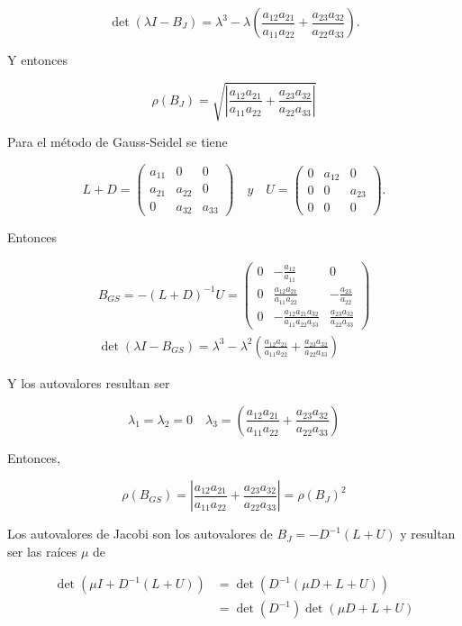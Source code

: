\documentclass[10pt]{book}
\begin{document}
$$
\operatorname{det}\left(\lambda I-B_{J}\right)=\lambda^{3}-\lambda\left(\frac{a_{12} a_{21}}{a_{11} a_{22}}+\frac{a_{23} a_{32}}{a_{22} a_{33}}\right) .
$$

Y entonces

$$
\rho\left(B_{J}\right)=\sqrt{\left|\frac{a_{12} a_{21}}{a_{11} a_{22}}+\frac{a_{23} a_{32}}{a_{22} a_{33}}\right|}
$$

Para el método de Gauss-Seidel se tiene

$$
L+D=\left(\begin{array}{ccc}
a_{11} & 0 & 0 \\
a_{21} & a_{22} & 0 \\
0 & a_{32} & a_{33}
\end{array}\right) \quad y \quad U=\left(\begin{array}{ccc}
0 & a_{12} & 0 \\
0 & 0 & a_{23} \\
0 & 0 & 0
\end{array}\right) .
$$

Entonces

$$
\begin{gathered}
B_{G S}=-(L+D)^{-1} U=\left(\begin{array}{ccc}
0 & -\frac{a_{12}}{a_{11}} & 0 \\
0 & \frac{a_{12} a_{21}}{a_{11} a_{22}} & -\frac{a_{23}}{a_{22}} \\
0 & -\frac{a_{12} a_{21} a_{32}}{a_{11} a_{22} a_{33}} & \frac{a_{23} a_{32}}{a_{22} a_{33}}
\end{array}\right) \\
\operatorname{det}\left(\lambda I-B_{G S}\right)=\lambda^{3}-\lambda^{2}\left(\frac{a_{12} a_{21}}{a_{11} a_{22}}+\frac{a_{23} a_{32}}{a_{22} a_{33}}\right)
\end{gathered}
$$

Y los autovalores resultan ser

$$
\lambda_{1}=\lambda_{2}=0 \quad \lambda_{3}=\left(\frac{a_{12} a_{21}}{a_{11} a_{22}}+\frac{a_{23} a_{32}}{a_{22} a_{33}}\right)
$$

Entonces,

$$
\rho\left(B_{G S}\right)=\left|\frac{a_{12} a_{21}}{a_{11} a_{22}}+\frac{a_{23} a_{32}}{a_{22} a_{33}}\right|=\rho\left(B_{J}\right)^{2}
$$

Los autovalores de Jacobi son los autovalores de $B_{J}=-D^{-1}(L+U)$ y resultan ser las raíces $\mu$ de

$$
\begin{aligned}
\operatorname{det}\left(\mu I+D^{-1}(L+U)\right) & =\operatorname{det}\left(D^{-1}(\mu D+L+U)\right) \\
& =\operatorname{det}\left(D^{-1}\right) \operatorname{det}(\mu D+L+U)
\end{aligned}
$$
\end{document}
